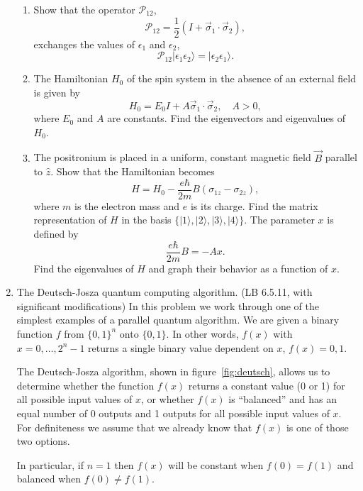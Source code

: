 \documentclass[letterpaper,11pt]{article}
\begin{document}
\begin{enumerate}
\begin{enumerate}
    \item Show that the operator $\mathcal{P}_{12}$,
    $$ \mathcal{P}_{12} = \frac{1}{2} (I + \vec\sigma_1 \cdot \vec\sigma_2), $$
    exchanges the values of $\epsilon_1$ and $\epsilon_2$,
    $$ \mathcal{P}_{12} | \epsilon_1 \epsilon_2 \rangle = | \epsilon_2 \epsilon_1 \rangle. $$
    \item The Hamiltonian $H_0$ of the spin system in the absence of an external field is given by
    $$ H_0 = E_0 I + A \vec\sigma_1 \cdot \vec\sigma_2, \quad A > 0, $$
    where $E_0$ and $A$ are constants. Find the eigenvectors and eigenvalues of $H_0$.
    \item The positronium is placed in a uniform, constant magnetic field $\vec{B}$ parallel to $\hat{z}$. Show that the Hamiltonian becomes
    $$ H = H_0 - \frac{e\hbar}{2m} B (\sigma_{1z} - \sigma_{2z}), $$
    where $m$ is the electron mass and $e$ is its charge. Find the matrix representation of $H$ in the basis $\{ |1\rangle, |2\rangle, |3\rangle, |4\rangle \}$. The parameter $x$ is defined by
    $$ \frac{e\hbar}{2m} B = -A x. $$
    Find the eigenvalues of $H$ and graph their behavior as a function of $x$.
  \end{enumerate}
  \item The Deutsch-Josza quantum computing algorithm. (LB 6.5.11, with significant modifications)
  In this problem we work through one of the simplest examples of a parallel quantum algorithm. We are given a binary function $f$ from $\{0,1\}^n$ onto $\{0,1\}$. In other words, $f(x)$ with $x = 0,\ldots,2^n-1$ returns a single binary value dependent on $x$, $f(x) = 0, 1$.

  The Deutsch-Josza algorithm, shown in figure~\ref{fig:deutsch}, allows us to determine whether the function $f(x)$ returns a constant value (0 or 1) for all possible input values of $x$, or whether $f(x)$ is ``balanced'' and has an equal number of 0 outputs and 1 outputs for all possible input values of $x$. For definiteness we assume that we already know that $f(x)$ is one of those two options.

  In particular, if $n = 1$ then $f(x)$ will be constant when $f(0) = f(1)$ and balanced when $f(0) \ne f(1)$.


\end{enumerate}
\end{document}
